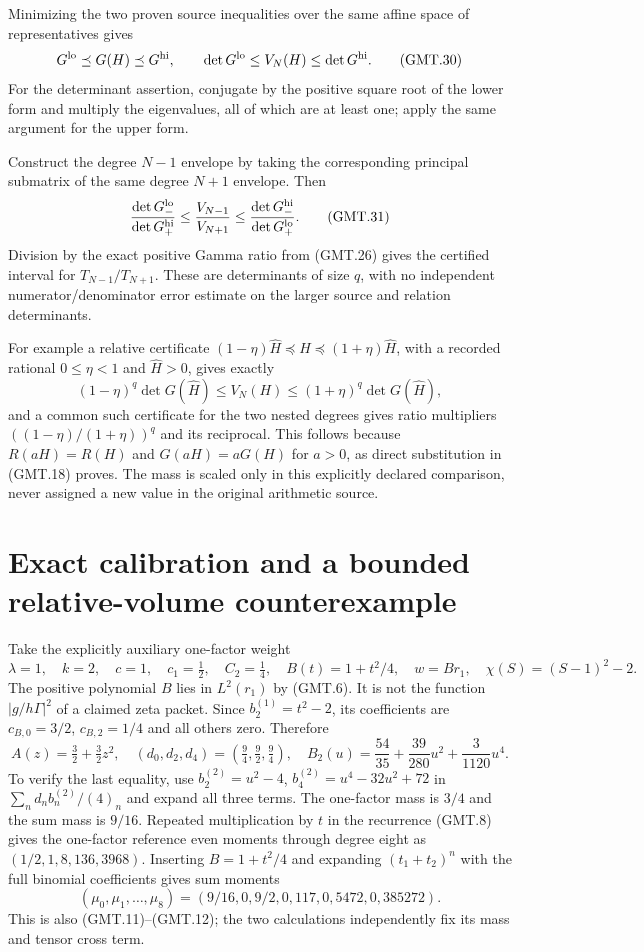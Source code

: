 \documentclass[11pt]{article}
\begin{document}
Minimizing the two proven source inequalities over the same affine
space of representatives gives
\[
 G^{\rm lo}\preceq G(H)\preceq G^{\rm hi},\qquad
 \det G^{\rm lo}\le V_N(H)\le\det G^{\rm hi}.                  \tag{GMT.30}
\]
For the determinant assertion, conjugate by the positive square root
of the lower form and multiply the eigenvalues, all of which are at
least one; apply the same argument for the upper form.

Construct the degree $N-1$ envelope by taking the corresponding
principal submatrix of the same degree $N+1$ envelope. Then
\[
 \frac{\det G_-^{\rm lo}}{\det G_+^{\rm hi}}
 \le\frac{V_{N-1}}{V_{N+1}}
 \le\frac{\det G_-^{\rm hi}}{\det G_+^{\rm lo}}.               \tag{GMT.31}
\]
Division by the exact positive Gamma ratio from (GMT.26) gives the
certified interval for $T_{N-1}/T_{N+1}$. These are determinants
of size $q$, with no independent numerator/denominator error estimate
on the larger source and relation determinants.

For example a relative certificate
$(1-\eta)\widehat H\preceq H\preceq(1+\eta)\widehat H$,
with a recorded rational $0\le\eta<1$ and $\widehat H>0$,
gives exactly
\[
 (1-\eta)^q\det G(\widehat H)\le V_N(H)
       \le(1+\eta)^q\det G(\widehat H),
\]
and a common such certificate for the two nested degrees gives ratio
multipliers $((1-\eta)/(1+\eta))^q$ and its reciprocal.
This follows because $R(aH)=R(H)$ and $G(aH)=aG(H)$ for $a>0$,
as direct substitution in (GMT.18) proves. The mass is scaled only
in this explicitly declared comparison, never assigned a new value
in the original arithmetic source.

\section{Exact calibration and a bounded relative-volume counterexample}

Take the explicitly auxiliary one-factor weight
\[
 \lambda=1,\quad k=2,\quad c=1,\quad
 c_1=\tfrac12,\quad C_2=\tfrac14,\quad
 B(t)=1+t^2/4,\quad w=B r_1,\quad
 \chi(S)=(S-1)^2-2.                                           \tag{GMT.32}
\]
The positive polynomial $B$ lies in $L^2(r_1)$ by (GMT.6).
It is not the function $|g/h\Gamma|^2$ of a claimed zeta packet.
Since $b_2^{(1)}=t^2-2$, its coefficients are
$c_{B,0}=3/2$, $c_{B,2}=1/4$ and all others zero. Therefore
\[
 A(z)=\tfrac32+\tfrac32z^2,\quad
 (d_0,d_2,d_4)=(\tfrac94,\tfrac92,\tfrac94),\quad
 B_2(u)=\frac{54}{35}+\frac{39}{280}u^2+\frac{3}{1120}u^4.
                                                                    \tag{GMT.33}
\]
To verify the last equality, use
$b_2^{(2)}=u^2-4$,
$b_4^{(2)}=u^4-32u^2+72$ in
$\sum_n d_nb_n^{(2)}/(4)_n$ and expand all three terms.
The one-factor mass is $3/4$ and the sum mass is $9/16$.
Repeated multiplication by $t$ in the recurrence (GMT.8) gives
the one-factor reference even moments through degree eight as
$(1/2,1,8,136,3968)$. Inserting $B=1+t^2/4$ and expanding
$(t_1+t_2)^n$ with the full binomial coefficients gives sum moments
\[
 (\mu_0,\mu_1,\ldots,\mu_8)
 =(9/16,0,9/2,0,117,0,5472,0,385272).                          \tag{GMT.34}
\]
This is also (GMT.11)--(GMT.12); the two calculations independently
fix its mass and tensor cross term.
\end{document}
